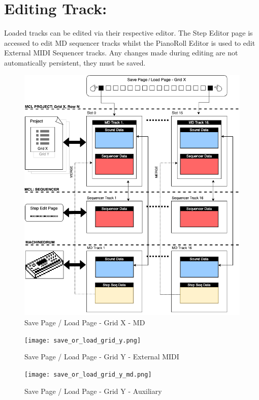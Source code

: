 \section{Editing Track:}
Loaded tracks can be edited via their respective editor. The Step Editor page is accessed to edit MD sequencer tracks whilst the PianoRoll Editor is used to edit External MIDI Sequencer tracks. Any changes made during editing are not automatically persistent, they must be saved.\\


\newpage
\begin{figure}
    \centering
    \includegraphics[scale=0.6]{save_or_load_grid_x.png}
    \caption{Save Page / Load Page - Grid X - MD }
    \label{fig:my_label}
\end{figure}
\newpage
\begin{figure}
    \centering
    \texttt{[image: save\_or\_load\_grid\_y.png]}
    \caption{Save Page / Load Page - Grid Y - External MIDI}
    \label{fig:my_label}
\end{figure}
\newpage
\begin{figure}
    \centering
    \texttt{[image: save\_or\_load\_grid\_y\_md.png]}
    \caption{Save Page / Load Page - Grid Y - Auxiliary}
    \label{fig:my_label}
\end{figure}
